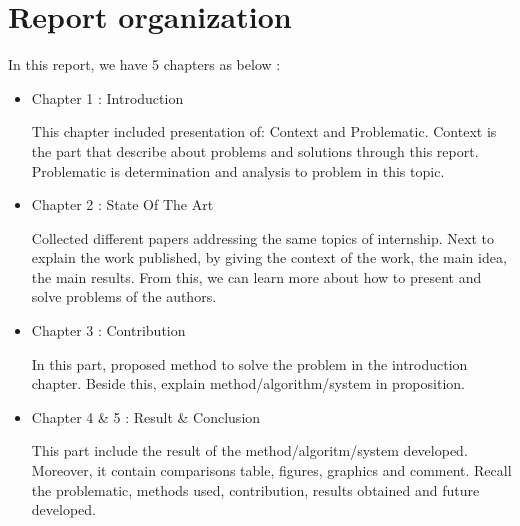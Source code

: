 \section{Report organization}
In this report, we have 5 chapters as below :
\begin{itemize}
\item Chapter 1 : Introduction

This chapter included presentation of: Context and Problematic. Context is the part that describe about problems and solutions through this report. Problematic is determination and analysis to problem in this topic. 
\item  Chapter 2 : State Of The Art

Collected different papers addressing the same topics of internship. Next to explain the work published, by giving the context of the work, the main idea, the main results. From this, we can learn more about how to present and solve problems of the authors. 

\item  Chapter 3 : Contribution

In this part, proposed method to solve the problem in the introduction chapter. Beside this, explain method/algorithm/system in proposition.

\item  Chapter 4 \& 5 : Result \& Conclusion

This part include the result of the method/algoritm/system developed. Moreover, it contain comparisons table,  figures, graphics and comment. Recall the problematic, methods used,  contribution, results obtained and future developed.

\end{itemize}

